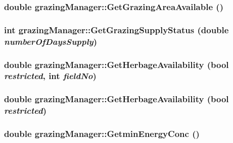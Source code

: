 \label{classgrazing_manager_aa45455953b5da3c6c7898c9e99bb274b}
\hypertarget{classgrazing_manager_a4523eb886c59064baeb1bf9d87ddbe50}{
\subsubsection[{GetGrazingAreaAvailable}]{\setlength{\rightskip}{0pt plus 5cm}double grazingManager::GetGrazingAreaAvailable ()}}
\label{classgrazing_manager_a4523eb886c59064baeb1bf9d87ddbe50}
\hypertarget{classgrazing_manager_a2e8c040172f02e13bf9642b493ea1ab0}{
\subsubsection[{GetGrazingSupplyStatus}]{\setlength{\rightskip}{0pt plus 5cm}int grazingManager::GetGrazingSupplyStatus (double {\em numberOfDaysSupply})}}
\label{classgrazing_manager_a2e8c040172f02e13bf9642b493ea1ab0}
\hypertarget{classgrazing_manager_a4f0ad2c2781ed63cc717059d3780d548}{
\subsubsection[{GetHerbageAvailability}]{\setlength{\rightskip}{0pt plus 5cm}double grazingManager::GetHerbageAvailability (bool {\em restricted}, \/  int {\em fieldNo})}}
\label{classgrazing_manager_a4f0ad2c2781ed63cc717059d3780d548}
\hypertarget{classgrazing_manager_a9d3a5982adf0406463307e6b25a62f0c}{
\subsubsection[{GetHerbageAvailability}]{\setlength{\rightskip}{0pt plus 5cm}double grazingManager::GetHerbageAvailability (bool {\em restricted})}}
\label{classgrazing_manager_a9d3a5982adf0406463307e6b25a62f0c}
\hypertarget{classgrazing_manager_abfbe66462e43096b46212a43593c7946}{
\subsubsection[{GetminEnergyConc}]{\setlength{\rightskip}{0pt plus 5cm}double grazingManager::GetminEnergyConc ()}}
